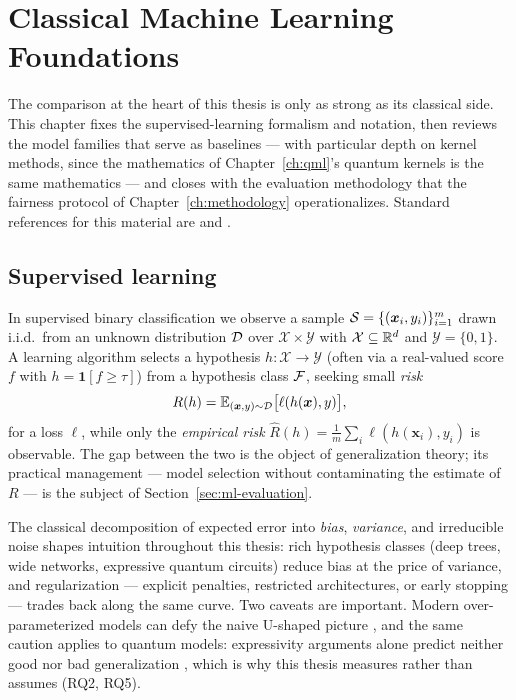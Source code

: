 \chapter{Classical Machine Learning Foundations}
\label{ch:classical}

The comparison at the heart of this thesis is only as strong as its classical
side. This chapter fixes the supervised-learning formalism and notation, then
reviews the model families that serve as baselines --- with particular depth on
kernel methods, since the mathematics of Chapter~\ref{ch:qml}'s quantum kernels
is the same mathematics --- and closes with the evaluation methodology that the
fairness protocol of Chapter~\ref{ch:methodology} operationalizes. Standard
references for this material are \citet{bishop2006prml} and
\citet{hastie2009esl}.

\section{Supervised learning}
\label{sec:ml-setup}

In supervised binary classification we observe a sample
$\mathcal{S} = \{(\bm{x}_i, y_i)\}_{i=1}^{m}$ drawn i.i.d.\ from an unknown
distribution $\mathcal{D}$ over $\mathcal{X} \times \mathcal{Y}$ with
$\mathcal{X} \subseteq \mathbb{R}^d$ and $\mathcal{Y} = \{0, 1\}$. A learning
algorithm selects a hypothesis $h \colon \mathcal{X} \to \mathcal{Y}$ (often
via a real-valued score $f$ with $h = \mathbf{1}[f \ge \tau]$) from a
hypothesis class $\mathcal{F}$, seeking small \emph{risk}
\begin{equation}
  R(h) = \mathbb{E}_{(\bm{x}, y) \sim \mathcal{D}} \bigl[ \ell(h(\bm{x}), y) \bigr],
\end{equation}
for a loss $\ell$, while only the \emph{empirical risk}
$\widehat{R}(h) = \tfrac{1}{m} \sum_i \ell(h(\bm{x}_i), y_i)$ is observable.
The gap between the two is the object of generalization theory; its practical
management --- model selection without contaminating the estimate of $R$ ---
is the subject of Section~\ref{sec:ml-evaluation}.

The classical decomposition of expected error into \emph{bias},
\emph{variance}, and irreducible noise \citep{hastie2009esl} shapes intuition
throughout this thesis: rich hypothesis classes (deep trees, wide networks,
expressive quantum circuits) reduce bias at the price of variance, and
regularization --- explicit penalties, restricted architectures, or early
stopping --- trades back along the same curve. Two caveats are important.
Modern over-parameterized models can defy the naive U-shaped picture
\citep{goodfellow2016deep}, and the same caution applies to quantum models:
expressivity arguments alone predict neither good nor bad generalization
\citep{gilfuster2024rethinking}, which is why this thesis measures rather than
assumes (RQ2, RQ5).

